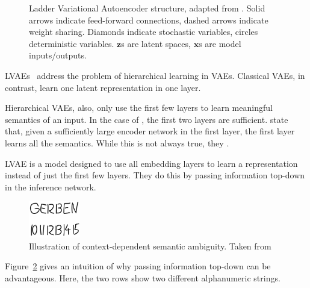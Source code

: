 \begin{figure}
    \caption[LVAE structure]{Ladder Variational Autoencoder structure, adapted from \citet{sonderby2016ladder}. Solid arrows indicate feed-forward connections, dashed arrows indicate weight sharing. Diamonds indicate stochastic variables, circles deterministic variables. $\bm{z}$s are latent spaces, $\bm{x}$s are model inputs/outputs.}
    \label{fig:lvae}
\end{figure}

\aclp{LVAE}~\citep{sonderby2016ladder} address the problem of hierarchical learning in \acp{VAE}.
Classical \acp{VAE}, in contrast, learn one latent representation in one layer.

Hierarchical \acp{VAE}, also, only use the first few layers to learn meaningful semantics of an input.
In the case of \citet{sonderby2016ladder}, the first two layers are sufficient.
\citet{zhao2017learning} state that, given a sufficiently large encoder network in the first layer, the first layer learns all the semantics.
While this is not always true, they .

\ac{LVAE} is a model designed to use all embedding layers to learn a representation instead of just the first few layers.
They do this by passing information top-down in the inference network.
\begin{figure}
    \centering
    \includegraphics[width=0.2\textwidth]{images/gerben.png}
    \caption[Context-Dependent Semantic Ambiguity]{Illustration of context-dependent semantic ambiguity. Taken from \citet[p. 61]{van2016auto}}
    \label{fig:gerben_ambiguity}
\end{figure}
Figure~\ref{fig:gerben_ambiguity} gives an intuition of why passing information top-down can be advantageous.
Here, the two rows show two different alphanumeric strings.

